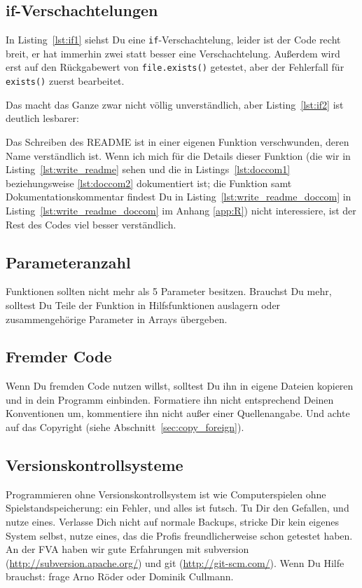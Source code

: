 \documentclass[twoside]{scrartcl}
\providecommand{\code}[1]{\texttt{#1}}
\begin{document}
\subsection{if-Verschachtelungen\label{sec:if}}
In Listing~\ref{lst:if1} siehst Du eine \code{if}-Verschachtelung, leider ist
der Code recht breit, er hat immerhin zwei statt besser eine Verschachtelung.
Au\ss{}erdem wird erst auf den R\"u{}ckgabewert von
\code{file.exists()} getestet, aber der Fehlerfall f\"u{}r
\code{exists()} zuerst bearbeitet.



Das macht das Ganze zwar nicht v\"o{}llig unverst\"a{}ndlich, aber
Listing~\ref{lst:if2} ist deutlich lesbarer:



Das Schreiben des README ist in
einer eigenen Funktion verschwunden, deren Name verst\"a{}ndlich ist. Wenn ich
mich f\"u{}r die Details dieser Funktion 
(die wir in Listing~\ref{lst:write_readme} sehen und die in
Listings~\ref{lst:doccom1} beziehungsweise \ref{lst:doccom2} dokumentiert ist;
die Funktion samt Dokumentationskommentar findest Du in 
Listing~\ref{lst:write_readme_doccom} in Listing~\ref{lst:write_readme_doccom}
im Anhang \ref{app:R})
nicht interessiere, ist der Rest des Codes viel besser verst\"a{}ndlich.



\subsection{Parameteranzahl\label{sec:parameteranzahl}} Funktionen sollten nicht
mehr als 5 Parameter
besitzen.
Brauchst Du mehr, solltest Du Teile der Funktion in Hilfsfunktionen auslagern
oder zusammengeh\"o{}rige Parameter in Arrays \"u{}bergeben.

\subsection{Fremder Code} Wenn Du fremden Code nutzen willst, solltest Du ihn in
eigene Dateien kopieren und in dein Programm einbinden. 
Formatiere ihn nicht entsprechend Deinen Konventionen um, 
kommentiere ihn nicht au\ss{}er einer Quellenangabe. 
Und achte auf das Copyright (siehe Abschnitt~\ref{sec:copy_foreign}).

\subsection{Versionskontrollsysteme\label{sec:vcs}}
Programmieren ohne Versionskontrollsystem ist wie Computerspielen ohne 
Spielstandspeicherung: ein Fehler, und alles ist futsch.
Tu Dir den Gefallen, und nutze eines.
Verlasse Dich nicht auf normale Backups, stricke Dir kein eigenes System selbst,
nutze eines, das die Profis freundlicherweise schon getestet haben. 
An der FVA haben wir gute Erfahrungen mit 
subversion (\url{http://subversion.apache.org/})
und git (\url{http://git-scm.com/}).
Wenn Du Hilfe brauchst: frage Arno R\"o{}der oder Dominik Cullmann.  
\end{document}
